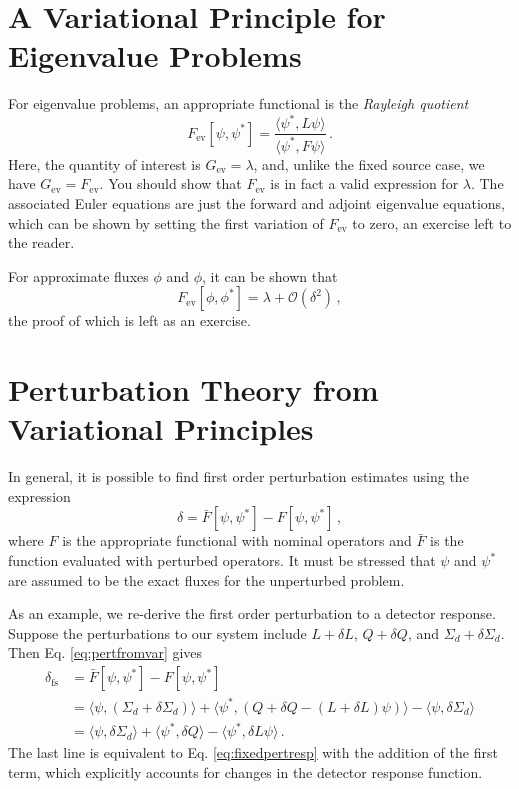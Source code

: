 \section*{A Variational Principle for Eigenvalue Problems}

For eigenvalue problems, an appropriate functional is 
the \textit{Rayleigh quotient}
\begin{equation}
 F_{\text{ev}}[\psi,\psi^*] = 
   \frac{\langle \psi^*,L\psi \rangle}{ \langle \psi^*, F \psi \rangle } \, .
 \label{eq:rayleigh}
\end{equation}
Here, the quantity of interest is $G_{\text{ev}} = \lambda$, and, unlike the 
fixed source case, we have $G_{\text{ev}} = F_{\text{ev}}$.  You should show 
that $F_{\text{ev}}$ is in fact a valid expression for $\lambda$.  The 
associated Euler equations are just the forward and adjoint eigenvalue 
equations, which can be shown by setting the first variation 
of $F_{\text{ev}}$ to zero, an exercise left to the reader.

For approximate fluxes $\phi$ and $\phi$, it can be shown that
\begin{equation}
 F_{\text{ev}}[\phi,\phi^*] = \lambda + \mathcal{O}(\delta^2) \, ,
\end{equation}
the proof of which is left as an exercise.

\section*{Perturbation Theory from Variational Principles}

In general, it is possible to find first order perturbation estimates using 
the expression
\begin{equation}
 \delta = \bar{F}[\psi,\psi^*] - F[\psi,\psi^*] \, ,
 \label{eq:pertfromvar}
\end{equation}
where $F$ is the appropriate functional with nominal operators 
and $\bar{F}$ is the function evaluated with perturbed operators.  It must 
be stressed that $\psi$ and $\psi^*$ are assumed to be the exact fluxes for 
the unperturbed problem.

As an example, we re-derive the first order perturbation to a detector 
response.  Suppose the perturbations to our system 
include $L+\delta L$, $Q+\delta Q$, 
and $\Sigma_d + \delta \Sigma_d$.  Then Eq. \ref{eq:pertfromvar}  gives
\begin{equation}
\begin{split}
 \delta_{\text{fs}} &= \bar{F}[\psi,\psi^*] - F[\psi,\psi^*] \\
        &= \langle \psi, (\Sigma_d+\delta \Sigma_d) \rangle + 
           \langle \psi^*,(Q+\delta Q-(L+\delta L)\psi ) \rangle - 
           \langle \psi, \delta \Sigma_d \rangle \\
        &= \langle \psi,\delta \Sigma_d \rangle + 
           \langle \psi^* , \delta Q \rangle - 
           \langle \psi^*,\delta L \psi \rangle \, .
\end{split}
\label{eq:fixedpertvar}
\end{equation}
The last line is equivalent to Eq. \ref{eq:fixedpertresp} with the addition 
of the first term, which explicitly accounts for changes in the detector 
response function.


